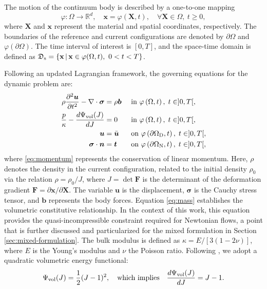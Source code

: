 \documentclass[11pt,english]{article}
\def\InitialDomain{\Omega}
\def\disp{\boldsymbol{u}}
\def\stress{\boldsymbol{\sigma}}
\def\VolPsi{\Psi_{\rm{vol}}}
\def\t{\boldsymbol{t}}
\def\temp{\dfrac{\partial^2 \disp}{\partial t^2}}
\begin{document}
    \noindent The motion of the continuum body is described by a one-to-one mapping
    \[
    \varphi: \InitialDomain \longrightarrow \mathbb{R}^d, \quad \mathbf{x} = \varphi(\mathbf{X},t), \quad \forall \mathbf{X} \in \InitialDomain, \ t \ge 0,
    \]
    where $\mathbf{X}$ and $\mathbf{x}$ represent the material and spatial coordinates, respectively. The boundaries of the reference and current configurations are denoted by $\partial \InitialDomain$ and $\varphi(\partial \InitialDomain)$. The time interval of interest is $[0,T]$, and the space-time domain is defined as $\mathfrak{D}_{\rm{s}} = \{\mathbf{x} \,|\, \mathbf{x} \in \varphi(\InitialDomain,t), \ 0 < t < T\}$. 
    
    Following an updated Lagrangian framework, the governing equations for the dynamic problem are:
        \begin{align}
            \rho \temp-\nabla \cdot \stress  &= \rho \boldsymbol{b} && \text{ in } \varphi \left( \InitialDomain,t \right), \; t\in]0,T[, \label{eq:momentum}\\
            \dfrac{p}{\kappa}-\dfrac{d\VolPsi(J)}{dJ} &=0 && \text{ in } \varphi \left( \InitialDomain, t\right), \; t\in]0,T[, \label{eq:mass}\\
            \disp &=\bar{\disp} && \text{ on } \varphi \left( \partial \Omega_{\rm{D}},t \right), \; t\in]0,T[,\label{eq:DirichletBC}\\
            \stress \cdot \boldsymbol{n} &= \t && \text{ on } \varphi \left( \partial \Omega_{\rm{N}},t \right), \; t\in]0,T[, \label{eq:NeumannBC}
        \end{align}
    where \eqref{eq:momentum} represents the conservation of linear momentum. Here, $\rho$ denotes the density in the current configuration, related to the initial density $\rho_0$ via the relation $\rho = \rho_0 / J$, where $J = \det \mathbf{F}$ is the determinant of the deformation gradient $\mathbf{F} = \partial \mathbf{x}/\partial \mathbf{X}$. The variable $\disp$ is the displacement, $\stress$ is the Cauchy stress tensor, and $\boldsymbol{b}$ represents the body forces. 
    Equation \eqref{eq:mass} establishes the volumetric constitutive relationship. In the context of this work, this equation provides the quasi-incompressible constraint required for Newtonian flows, a point that is further discussed and particularized for the mixed formulation in Section \ref{sec:mixed-formulation}. The bulk modulus is defined as $\kappa = E / [3(1-2\nu)]$, where $E$ is the Young's modulus and $\nu$ the Poisson ratio. Following \cite{horgan2009volumetric}, we adopt a quadratic volumetric energy functional:
    \[
    \VolPsi(J) = \dfrac{1}{2} (J - 1)^2, \quad \text{which implies} \quad \dfrac{d\VolPsi(J)}{dJ} = J - 1.
    \]
    
\end{document}
